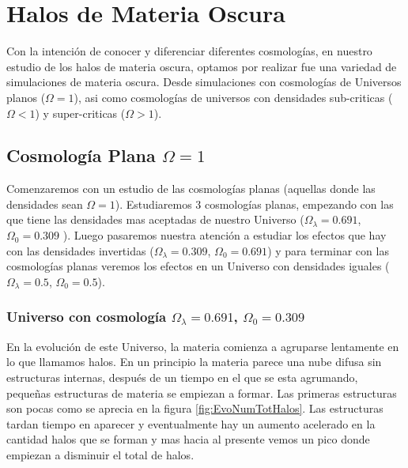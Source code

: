 \chapter{Halos de Materia Oscura}
\setcounter{equation}{0}

\noindent Con la intención de conocer y diferenciar diferentes cosmologías, en nuestro estudio de los halos de materia oscura, optamos por realizar fue una variedad de simulaciones de materia oscura. Desde simulaciones con cosmologías de Universos planos ($\Omega = 1$), asi como cosmologías  de universos con densidades sub-criticas ($\Omega < 1$) y super-criticas ($\Omega > 1$).

\section[Cosmología Plana \texorpdfstring{$\Omega = 1$}{Omega = 1}]{Cosmología Plana \texorpdfstring{$\Omega = 1$}{Omega = 1}}

\noindent Comenzaremos con un estudio de las cosmologías planas (aquellas donde las densidades sean $\Omega = 1$). Estudiaremos 3 cosmologías planas, empezando con las que tiene las densidades mas aceptadas de nuestro Universo ($\Omega_\lambda = 0.691$, $\Omega_0 = 0.309$  \cite{2020A&A...641A...1P}). Luego pasaremos nuestra atención a estudiar los efectos que hay con las densidades invertidas ($\Omega_\lambda = 0.309$, $\Omega_0 = 0.691$) y para terminar con las cosmologías planas veremos los efectos en un Universo con densidades iguales ($\Omega_\lambda = 0.5$, $\Omega_0 = 0.5$).

 \subsection{Universo con cosmología  \texorpdfstring{$\Omega_\lambda = 0.691$, $\Omega_0 = 0.309$ }{Omega lambda = 0.691, Omega 0 = 0.309}  }

 En la evolución de este Universo, la materia comienza a agruparse lentamente en lo que llamamos halos. En un principio la materia parece una nube difusa sin estructuras internas, después de un tiempo en el que se esta agrumando, pequeñas estructuras de materia se empiezan a formar. Las primeras estructuras son pocas como se aprecia en la figura \ref{fig:EvoNumTotHalos}. Las estructuras tardan tiempo en aparecer y eventualmente hay un aumento acelerado en la cantidad halos que se forman y mas hacia al presente vemos un pico donde empiezan a disminuir el total de halos.

